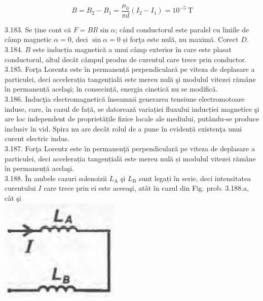 \documentclass[10pt]{article}
\begin{document}
$$
B=B_{2}-B_{1}=\frac{\mu_{0}}{\pi d}\left(I_{2}-I_{1}\right)=10^{-5} \mathrm{~T}
$$

3.183. Se ține cont că $F=B I l \sin \alpha$; când conductorul este paralel cu liniile de câmp magnetic $\alpha=0$, deci $\sin \alpha=0$ și forţa este nulă, nu maximă. Corect $D$.\\
3.184. $B$ este inducția magnetică a unui câmp exterior în care este plasat conductorul, altul decât câmpul produs de curentul care trece prin conductor.\\
3.185. Forţa Lorentz este în permanență perpendiculară pe viteza de deplasare a particulei, deci accelerația tangențială este mereu nulă şi modulul vitezei rămâne în permanență acelaşi; în consecință, energia cinetică nu se modifică.\\
3.186. Inducţia electromagnetică înseamnă generarea tensiune electromotoare induse, care, în cazul de față, se datorează variației fluxului inducției magnetice şi are loc independent de proprietățile fizice locale ale mediului, putându-se produce inclusiv în vid. Spira nu are decât rolul de a pune în evidență existenţa unui curent electric indus.\\
3.187. Forţa Lorentz este în permanenţă perpendiculară pe viteza de deplasare a particulei, deci accelerația tangențială este mereu nulă și modulul vitezei rămâne în permanență acelaşi.\\
3.188. În ambele cazuri solenoizii $L_{\mathrm{A}}$ şi $L_{\mathrm{B}}$ sunt legați în serie, deci intensitatea curentului $I$ care trece prin ei este aceeaşi, atât în cazul din Fig. prob. 3.188.a, cât şi\\
\includegraphics[max width=\textwidth, center]{2025_07_01_5b3ff9fa0d508c8e9f17g-377}\\
\end{document}
